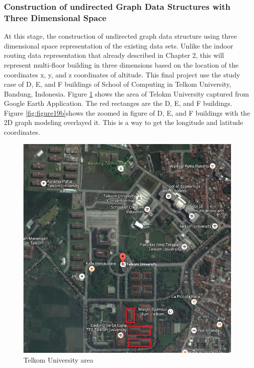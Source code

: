 \subsubsection{Construction of undirected Graph Data Structures with Three Dimensional Space}
At this stage, the construction of undirected graph data structure using three dimensional space representation of the existing data sets. Unlike the indoor routing data representation that already described in Chapter 2, this will represent multi-floor building in three dimensions based on the location of the coordinates x, y, and z coordinates of altitude. This final project use the study case of D, E, and F buildings of School of Computing in Telkom University, Bandung, Indonesia. Figure \ref{fig:figure19a} shows the area of Telokm University captured from Google Earth Application. The red rectanges are the D, E, and F buildings. Figure \ref{fig:figure19b}shows the zoomed in figure of D, E, and F buildings with the 2D graph modeling overlayed it. This is a way to get the longitude and latitude coordinates. 

\begin{figure}[h!]
	\centering
	\includegraphics[scale=0.7]{figure19a.png}
	\caption{Telkom University area}
	\label{fig:figure19a}
\end{figure}


